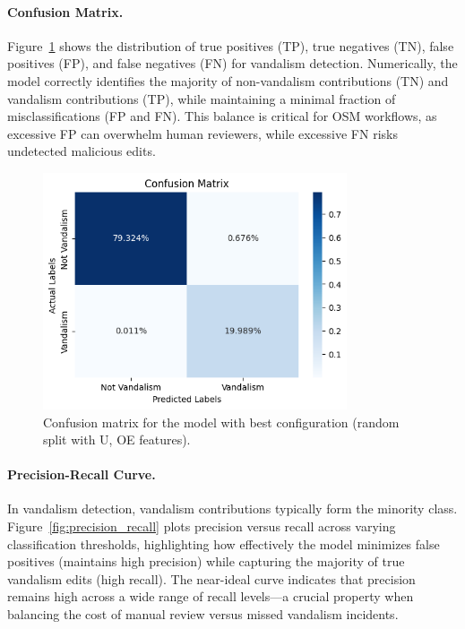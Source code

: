 \documentclass[
    13pt, %
    a4paper, %
    listof=totoc, %
    bibliography=totoc, %
    index=totoc, %
    headsepline
]{scrreprt}
\begin{document}
\paragraph{Confusion Matrix.}
Figure~\ref{fig:confusion_matrix} shows the distribution of true positives (TP), true negatives (TN), false positives (FP), and false negatives (FN) for vandalism detection. Numerically, the model correctly identifies the majority of non-vandalism contributions (TN) and vandalism contributions (TP), while maintaining a minimal fraction of misclassifications (FP and FN). This balance is critical for OSM workflows, as excessive FP can overwhelm human reviewers, while excessive FN risks undetected malicious edits.

\begin{figure}[H]
    \centering
    \includegraphics[width=0.8\textwidth]{confusion_matrix.png}
    \caption{Confusion matrix for the model with best configuration (random split with U, OE features).}
    \label{fig:confusion_matrix}
\end{figure}

\paragraph{Precision-Recall Curve.}
In vandalism detection, vandalism contributions typically form the minority class. Figure~\ref{fig:precision_recall} plots precision versus recall across varying classification thresholds, highlighting how effectively the model minimizes false positives (maintains high precision) while capturing the majority of true vandalism edits (high recall). The near-ideal curve indicates that precision remains high across a wide range of recall levels—a crucial property when balancing the cost of manual review versus missed vandalism incidents.
\end{document}
